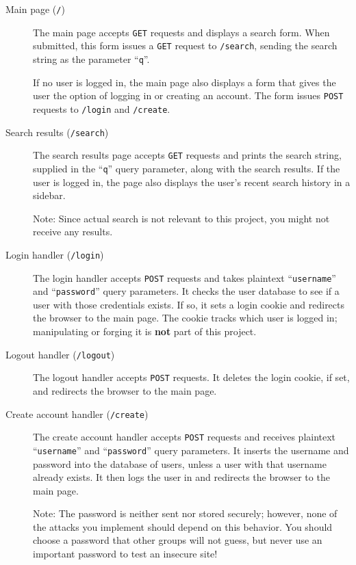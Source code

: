 \documentclass[letterpaper,12pt]{report}
\begin{document}
\begin{description}
	
\item[Main page (\texttt{/})]
	
	The main page accepts \texttt{GET} requests and displays a search form. When submitted, this form issues a \texttt{GET} request to \texttt{/search}, sending the search string as the parameter ``\texttt{q}''.  
	
	If no user is logged in, the main page also displays a form that gives the user the option of logging in or creating an account.  The form issues \texttt{POST} requests to \texttt{/login} and \texttt{/create}.
	
	\item[Search results (\texttt{/search})]
	
	The search results page accepts \texttt{GET} requests and prints the search string, supplied in the ``\texttt{q}'' query parameter, along with the search results.   If the user is logged in, the page also displays the user's recent search history in a sidebar.
	
	{Note: Since actual search is not relevant to this project, you might not receive any results.}
	
	\item[Login handler (\texttt{/login})]
	
	The login handler accepts \texttt{POST} requests and takes plaintext ``\texttt{username}'' and ``\texttt{password}'' query parameters.  It checks the user database to see if a user with those credentials exists.  If so, it sets a login cookie and redirects the browser to the main page.  The cookie tracks which user is logged in; manipulating or forging it is \textbf{not} part of this project.
	
	\item[Logout handler (\texttt{/logout})]
	
	The logout handler accepts \texttt{POST} requests.  It deletes the login cookie, if set, and redirects the browser to the main page.
	\smallskip
	
	\item[Create account handler (\texttt{/create})]
	
	The create account handler accepts \texttt{POST} requests and receives plaintext ``\texttt{username}'' and ``\texttt{password}'' query parameters.  It inserts the username and password into the database of users, unless a user with that username already exists.  It then logs the user in and redirects the browser to the main page.
	
	{Note: The password is neither sent nor stored securely; however, none of the attacks you implement should depend on this behavior.  You should choose a password that other groups will not guess, but never use an important password to test an insecure site!}
	
\end{description}
\end{document}
